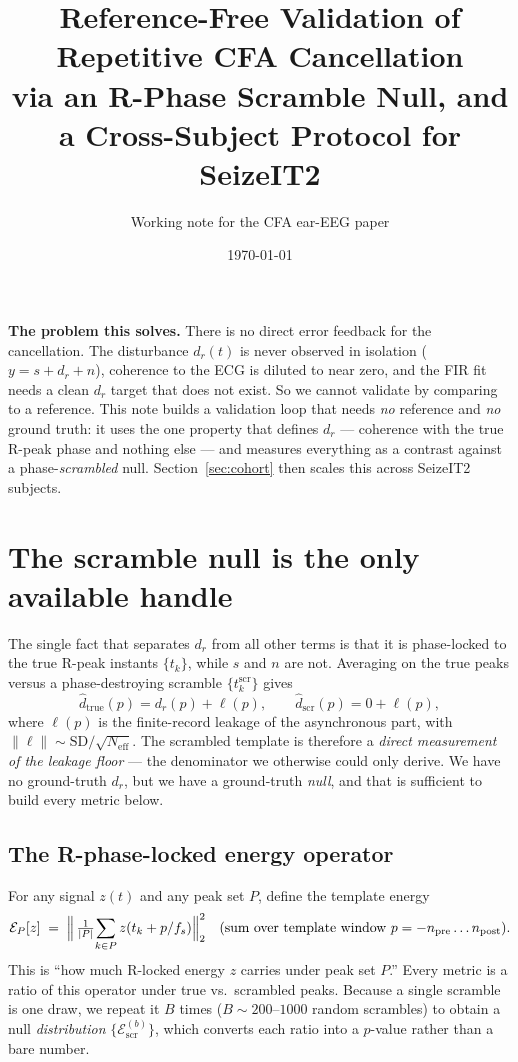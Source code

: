 \documentclass[11pt]{article}
\title{\vspace{-2em}\bfseries Reference-Free Validation of Repetitive CFA Cancellation\\
via an R-Phase Scramble Null, and a Cross-Subject Protocol for SeizeIT2}
\author{Working note for the CFA ear-EEG paper}
\date{\today}
\newcommand{\Elock}{\mathcal{E}}
\newcommand{\true}{\mathrm{true}}
\newcommand{\scr}{\mathrm{scr}}
\newcommand{\Neff}{N_{\mathrm{eff}}}
\newcommand{\dhat}{\widehat{d}}
\begin{document}
\maketitle
\vspace{-1.5em}

\noindent
\textbf{The problem this solves.} There is no direct error feedback for the cancellation. The
disturbance $d_r(t)$ is never observed in isolation ($y=s+d_r+n$), coherence to the ECG is diluted
to near zero, and the FIR fit needs a clean $d_r$ target that does not exist. So we cannot validate
by comparing to a reference. This note builds a validation loop that needs \emph{no} reference and
\emph{no} ground truth: it uses the one property that defines $d_r$ --- coherence with the true
R-peak phase and nothing else --- and measures everything as a contrast against a
phase-\emph{scrambled} null. Section~\ref{sec:cohort} then scales this across SeizeIT2 subjects.

\section{The scramble null is the only available handle}

The single fact that separates $d_r$ from all other terms is that it is phase-locked to the true
R-peak instants $\{t_k\}$, while $s$ and $n$ are not. Averaging on the true peaks versus a
phase-destroying scramble $\{t_k^{\scr}\}$ gives
\begin{equation}
\dhat_\true(p) = d_r(p) + \ell(p), \qquad
\dhat_\scr(p) = 0 + \ell(p),
\label{eq:twotemplates}
\end{equation}
where $\ell(p)$ is the finite-record leakage of the asynchronous part, with
$\|\ell\|\sim \mathrm{SD}/\sqrt{\Neff}$. The scrambled template is therefore a \emph{direct
measurement of the leakage floor} --- the denominator we otherwise could only derive. We have no
ground-truth $d_r$, but we have a ground-truth \emph{null}, and that is sufficient to build every
metric below.

\subsection*{The R-phase-locked energy operator}
For any signal $z(t)$ and any peak set $P$, define the template energy
\begin{equation}
\Elock_P[z] \;=\; \Bigl\|\, \tfrac{1}{|P|}\!\sum_{k\in P} z\!\left(t_k + p/f_s\right) \Bigr\|_2^2
\quad\text{(sum over template window } p=-n_{\mathrm{pre}}\ldots n_{\mathrm{post}}).
\label{eq:Eop}
\end{equation}
This is ``how much R-locked energy $z$ carries under peak set $P$.'' Every metric is a ratio of
this operator under true vs.\ scrambled peaks. Because a single scramble is one draw, we repeat it
$B$ times ($B\sim200$--$1000$ random scrambles) to obtain a null \emph{distribution}
$\{\Elock_{\scr}^{(b)}\}$, which converts each ratio into a $p$-value rather than a bare number.
\end{document}

